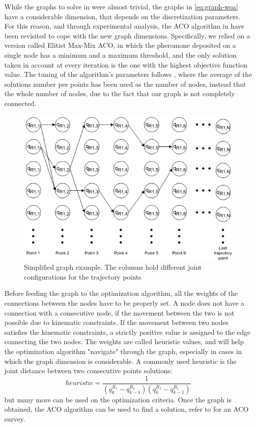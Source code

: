 \documentclass[twocolumn]{svjour3}
\newcommand{\rev}[1]{\textcolor{verde}{#1}}
\begin{document}
While the graphs to solve in \cite{Nicola2018} were almost trivial, the graphs in  \eqref{eq:graph-woa} have a considerable dimension, that depends on the discretization parameters.
For this reason, and through experimental analysis, the ACO algorithm in \cite{Nicola2018} have been revisited to cope with the new graph dimensions.
Specifically, we relied on a version called Elitist Max-Mix ACO, in which the pheromone deposited on a single node has a minimum and a maximum threshold, and the only solution taken in account at every iteration is the one with the highest objective function value.
The tuning of the algorithm's parameters follows \cite{pellegrini2006cal}, where the average of the solutions number per points  has been used as the number of nodes, instead that the whole number of nodes, due to the fact that our graph is not completely connected.


\begin{figure}[t]
	\centering
	\includegraphics[height=5 cm]{graph}
	\caption{Simplified graph example.
	The columns hold different joint configurations for the trajectory points }
	\label{graph}
\end{figure}

Before feeding the graph to the optimization algorithm, all the weights of the connections between the nodes have to be properly set.
A node does not have a connection with a consecutive node, if the movement between the two is not possible due to kinematic constraints.
If the movement between two nodes satisfies the kinematic constraints, a strictly positive value is assigned to the edge connecting the two nodes.
The weights are called heuristic values, and will help the optimization algorithm "navigate" through the graph, especially in cases in which the graph dimension is considerable.
A commonly used heuristic is the joint distance between two consecutive points solutions:
\begin{equation}
\label{eq_ACO_heu}
heuristic=\frac{1}{\left(q^{R_1}_{k}-q^{R_1}_{k-1}\right)\left(q^{R_1}_{k}-q^{R_1}_{k-1}\right)}
\end{equation}
but many more can be used on the optimization criteria.
Once the graph is obtained, the ACO algorithm can be used to find a solution, refer to \cite{Dorigo2006} for an ACO survey.
\end{document}
